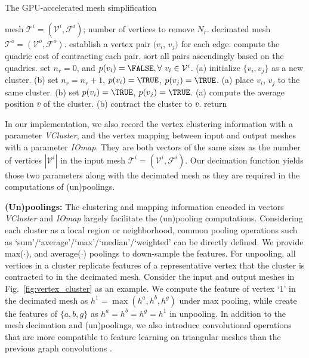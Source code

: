 \begin{algorithm}[t]
\caption{The GPU-accelerated mesh simplification}
\label{alg:Mesh_decimate_ours}
\begin{algorithmic}[1]
\renewcommand{\algorithmicrequire}{\textbf{Input:}}
\renewcommand{\algorithmicensure}{\textbf{Output:}}
\REQUIRE mesh $\mathcal{T}^i{=}(\mathcal{V}^i,\mathcal{F}^i)$;
number of vertices to remove $N_r$. \hspace{-4mm}
\ENSURE decimated mesh ${\mathcal{T}^o}{=}(\mathcal{V}^o,\mathcal{F}^o)$.
\vspace{1mm}
\STATE  establish a vertex pair $(v_i$, $v_j)$ for each edge. 
\STATE compute the quadric cost of contracting each pair.
\STATE sort all pairs ascendingly based on the quadrics.
\STATE set $n_r=0$, and $p(v_i)=\FALSE, \forall~v_i \in \mathcal{V}^i$. 
\STATE (a) initialize  $\{v_i, v_j\}$ as a new cluster.
\STATE (b) set $n_r=n_r+1$, $p(v_i)=\TRUE$, $p(v_j)=\TRUE$.
\ENDIF
\ENDFOR
{}
\STATE (a) place $v_i$, $v_j$ to the same cluster.
\STATE (b) set $p(v_i)=\TRUE$, $p(v_j)=\TRUE$.
\ENDIF
\ENDFOR
{}
\STATE (a) compute the average position $\bar{v}$ of the cluster.
\STATE (b) contract the cluster to $\bar{v}$.
\ENDFOR
\STATE return
\end{algorithmic}
\end{algorithm}
In our implementation, 
we also record the vertex clustering information with a parameter \textit{VCluster}, and the vertex mapping between input and output meshes with a parameter \textit{IOmap}. They are both vectors of the same sizes as the number of vertices $|\mathcal{V}^i|$ in the input mesh $\mathcal{T}^i=(\mathcal{V}^i,\mathcal{F}^i)$.
Our decimation function yields those two parameters along with the decimated mesh as they are required in the computations of (un)poolings. 

\vspace{1mm}
\noindent \textbf{(Un)poolings:} The clustering and mapping information  encoded in vectors \textit{VCluster} and \textit{IOmap} largely facilitate the (un)pooling computations.  
Considering each cluster as a local region or neighborhood, common pooling operations such as `sum'/`average'/`max'/`median'/`weighted' can be directly defined. We provide max($\cdot$), and average($\cdot$) poolings to down-sample the features. For unpooling, all vertices in a cluster replicate features of a representative vertex that the cluster is contracted to in the decimated mesh. 
Consider the input and output meshes in Fig.~\ref{fig:vertex_cluster} as an  example. We compute the feature of vertex `$1$' in the decimated mesh as $h^1=\max(h^a,h^b,h^g)$ under max pooling, while create the features of $\{a,b,g\}$ as $h^a=h^b=h^g=h^1$ in unpooling.
In addition to the mesh decimation and (un)poolings, we also introduce convolutional operations that are more compatible to feature learning on triangular meshes than the previous graph convolutions \cite{schult2020dualconvmesh}.

